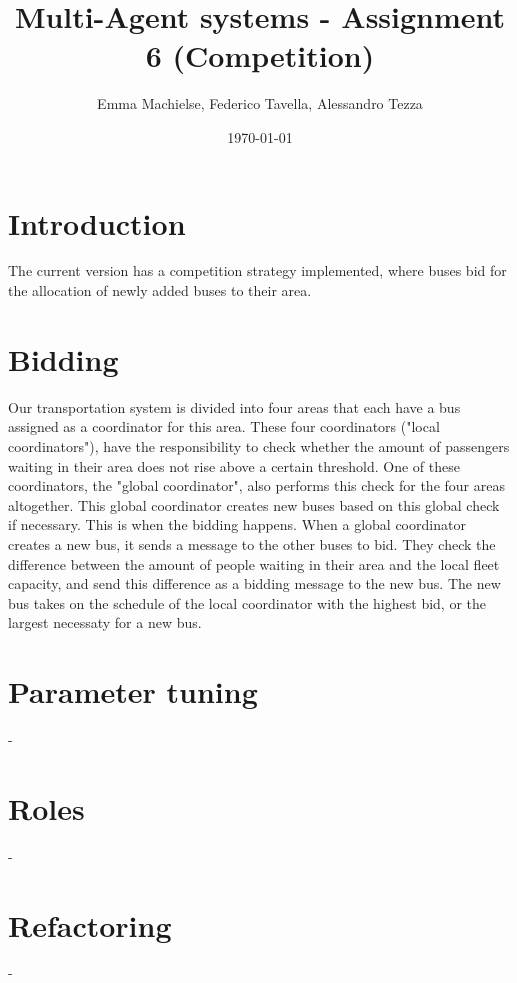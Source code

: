\documentclass[a4paper]{article}
\title{Multi-Agent systems - Assignment 6 (Competition)}
\author{Emma Machielse, Federico Tavella, Alessandro Tezza}
\date{\today}
\begin{document}
\maketitle

\section{Introduction}
The current version has a competition strategy implemented, where buses bid for the allocation of newly added buses to their area.

\section{Bidding} 

Our transportation system is divided into four areas that each have a bus assigned as a coordinator for this area. These four coordinators ("local coordinators"), have the responsibility to check whether the amount of passengers waiting in their area does not rise above a certain threshold. One of these coordinators, the "global coordinator", also performs this check for the four areas altogether. This global coordinator creates new buses based on this global check if necessary. 
\newline
This is when the bidding happens. When a global coordinator creates a new bus, it sends a message to the other buses to bid. They check the difference between the amount of people waiting in their area and the local fleet capacity, and send this difference as a bidding message to the new bus. The new bus takes on the schedule of the local coordinator with the highest bid, or the largest necessaty for a new bus.

\section{Parameter tuning}

-

\section{Roles}

-

\section{Refactoring}

-
\end{document}
